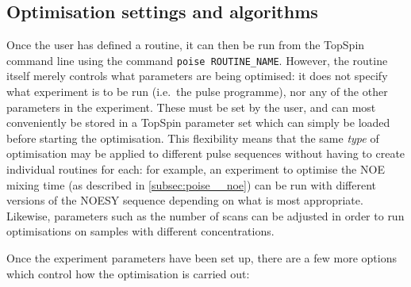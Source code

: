 \subsection{Optimisation settings and algorithms}
\label{subsec:poise__settings}

Once the user has defined a routine, it can then be run from the TopSpin command line using the command \texttt{poise ROUTINE\_NAME}.
However, the routine itself merely controls what parameters are being optimised: it does not specify what experiment is to be run (i.e.\ the pulse programme), nor any of the other parameters in the experiment.
These must be set by the user, and can most conveniently be stored in a TopSpin parameter set which can simply be loaded before starting the optimisation.
This flexibility means that the same \textit{type} of optimisation may be applied to different pulse sequences without having to create individual routines for each: for example, an experiment to optimise the NOE mixing time (as described in \cref{subsec:poise__noe}) can be run with different versions of the NOESY sequence depending on what is most appropriate.
Likewise, parameters such as the number of scans can be adjusted in order to run optimisations on samples with different concentrations.

Once the experiment parameters have been set up, there are a few more options which control how the optimisation is carried out:

